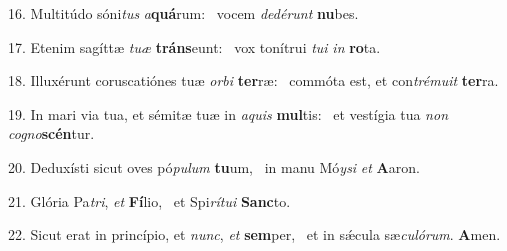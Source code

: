 16. Multitúdo sóni\textit{tus} \textit{a}\textbf{quá}rum: \ast\  vocem \textit{de}\textit{dé}\textit{runt} \textbf{nu}bes.\

17. Etenim sagíttæ \textit{tu}\textit{æ} \textbf{tráns}eunt: \ast\  vox tonítrui \textit{tu}\textit{i} \textit{in} \textbf{ro}ta.\

18. Illuxérunt coruscatiónes tuæ \textit{or}\textit{bi} \textbf{ter}ræ: \ast\  commóta est, et con\textit{tré}\textit{mu}\textit{it} \textbf{ter}ra.\

19. In mari via tua, et sémitæ tuæ in \textit{a}\textit{quis} \textbf{mul}tis: \ast\  et vestígia tua \textit{non} \textit{co}\textit{gno}\textbf{scén}tur.\

20. Deduxísti sicut oves pó\textit{pu}\textit{lum} \textbf{tu}um, \ast\  in manu Mó\textit{y}\textit{si} \textit{et} \textbf{A}aron.\

21. Glória Pa\textit{tri}, \textit{et} \textbf{Fí}lio, \ast\  et Spi\textit{rí}\textit{tu}\textit{i} \textbf{Sanc}to.\

22. Sicut erat in princípio, et \textit{nunc}, \textit{et} \textbf{sem}per, \ast\  et in sǽcula sæ\textit{cu}\textit{ló}\textit{rum}. \textbf{A}men.\


